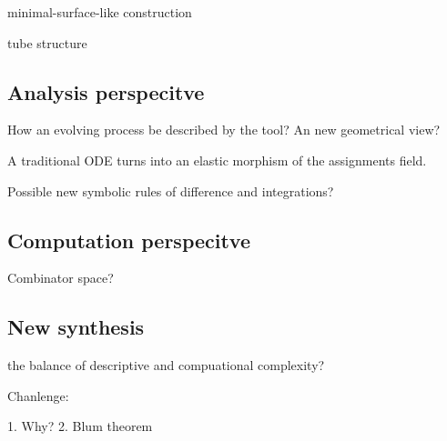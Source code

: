 \documentclass[12pt]{article}
\begin{document}
minimal-surface-like construction

tube structure

\subsection{Analysis perspecitve}

How an evolving process be described by the tool? An new geometrical view?

A traditional ODE turns into an elastic morphism of the assignments field.

Possible new symbolic rules of difference and integrations?

\subsection{Computation perspecitve}

Combinator space?

\subsection{New synthesis}

the balance of descriptive and compuational complexity?

Chanlenge:

1. Why?
2. Blum theorem
\end{document}
